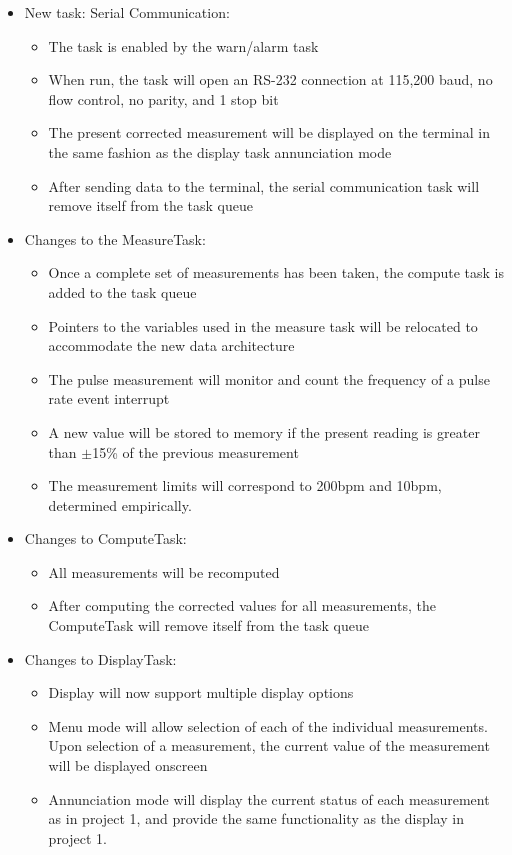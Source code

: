 \documentclass[12pt]{article} %
\begin{document}
\begin{itemize}
  \item New task: Serial Communication:
    \begin{itemize}
      \item The task is enabled by the warn/alarm task
      \item When run, the task will open an RS-232 connection at 115,200 baud,
          no flow control, no parity, and 1 stop bit
      \item The present corrected measurement will be displayed on the terminal
	in the same fashion as the display task annunciation mode
      \item After sending data to the terminal, the serial communication task
	will remove itself from the task queue
    \end{itemize}

  \item Changes to the MeasureTask:
    \begin{itemize}
      \item Once a complete set of measurements has been taken, the compute
	task is added to the task queue
      \item Pointers to the variables used in the measure task will be
	relocated to accommodate the new data architecture
      \item The pulse measurement will monitor and count the frequency of a
	pulse rate event interrupt
      \item A new value will be stored to memory if the present reading is
	greater than $\pm$15\% of the previous measurement
      \item The measurement limits will correspond to 200bpm and 10bpm,
	determined empirically. 
    \end{itemize}

  \item Changes to ComputeTask:
    \begin{itemize}
      \item All measurements will be recomputed
      \item After computing the corrected values for all measurements, the
	ComputeTask will remove itself from the task queue
    \end{itemize}

  \item Changes to DisplayTask:
    \begin{itemize}
      \item Display will now support multiple display options
      \item Menu mode will allow selection of each of the individual
	measurements. Upon selection of a measurement, the current value of the
	measurement will be displayed onscreen
      \item Annunciation mode will display the current status of each
	measurement as in project 1, and provide the same functionality as the
	display in project 1.
    \end{itemize}


\end{itemize}
\end{document}
